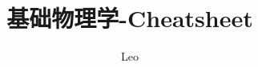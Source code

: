 \documentclass{ctexart}
\title{基础物理学-Cheatsheet}
\author{Leo}
\begin{document}
\newcommand{\dif}{\mathrm{d}}
\newcommand{\noindentbf}[1]{\noindent \textbf{#1} \quad}
\newcommand{\noindentbfline}[1]{\noindent \textbf{#1} \newline}

	\maketitle
	\tableofcontents
	\newpage


\end{document}
